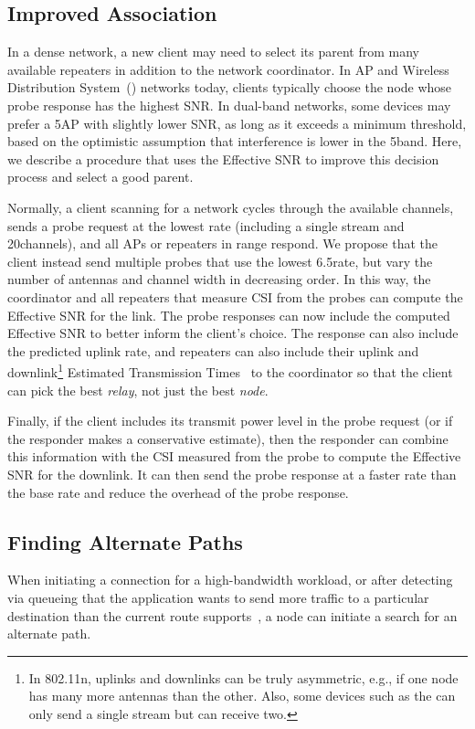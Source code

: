 \subsection{Improved Association}
In a dense network, a new client may need to select its parent from many available repeaters in addition to the network coordinator. In AP and Wireless Distribution System~() networks today, clients typically choose the node whose probe response has the highest SNR\@. In dual-band networks, some devices may prefer a 5\GHz AP with slightly lower SNR, as long as it exceeds a minimum threshold, based on the optimistic assumption that interference is lower in the 5\GHz band. Here, we describe a procedure that uses the Effective SNR to improve this decision process and select a good parent.

Normally, a client scanning for a network cycles through the available channels, sends a probe request at the lowest rate (including a single stream and 20\MHz channels), and all APs or repeaters in range respond. We propose that the client instead send multiple probes that use the lowest 6.5\Mbps rate, but vary the number of antennas and channel width in decreasing order. In this way, the coordinator and all repeaters that measure CSI from the probes can compute the Effective SNR for the link. The probe responses can now include the computed Effective SNR to better inform the client's choice. The response can also include the predicted uplink rate, and repeaters can also include their uplink and downlink\footnote{In 802.11n, uplinks and downlinks can be truly asymmetric, e.g., if one node has many more antennas than the other. Also, some devices such as the  can only send a single stream but can receive two.} Estimated Transmission Times~\cite{draves_ett} to the coordinator so that the client can pick the best \emph{relay}, not just the best \emph{node}.

Finally, if the client includes its transmit power level in the probe request (or if the responder makes a conservative estimate), then the responder can combine this information with the CSI measured from the probe to compute the Effective SNR for the downlink. It can then send the probe response at a faster rate than the base rate and reduce the overhead of the probe response.

\subsection{Finding Alternate Paths}
When initiating a connection for a high-bandwidth workload, or after detecting via queueing that the application wants to send more traffic to a particular destination than the current route supports~\cite{bahl_repeater}, a node can initiate a search for an alternate path.

